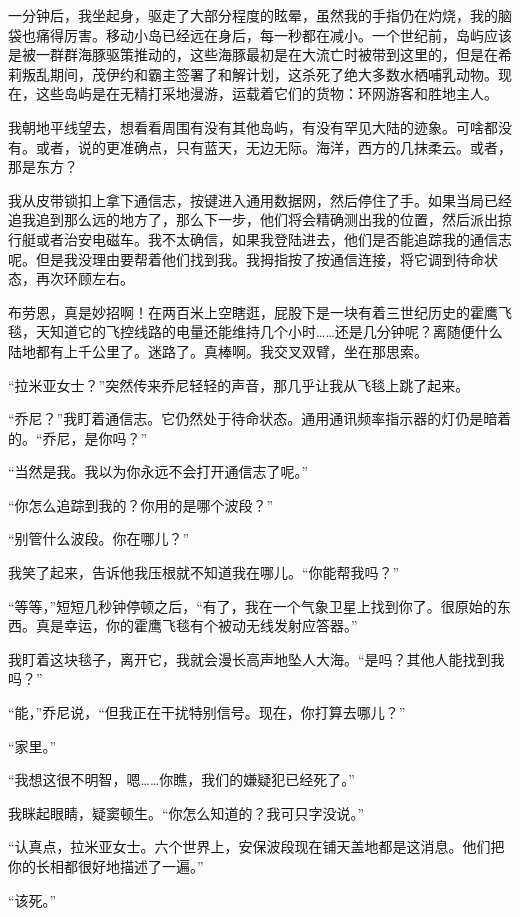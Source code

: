 \documentclass[AutoFakeBold=true]{book}
\begin{document}
一分钟后，我坐起身，驱走了大部分程度的眩晕，虽然我的手指仍在灼烧，我的脑袋也痛得厉害。移动小岛已经远在身后，每一秒都在减小。一个世纪前，岛屿应该是被一群群海豚驱策推动的，这些海豚最初是在大流亡时被带到这里的，但是在希莉叛乱期间，茂伊约和霸主签署了和解计划，这杀死了绝大多数水栖哺乳动物。现在，这些岛屿是在无精打采地漫游，运载着它们的货物：环网游客和胜地主人。

我朝地平线望去，想看看周围有没有其他岛屿，有没有罕见大陆的迹象。可啥都没有。或者，说的更准确点，只有蓝天，无边无际。海洋，西方的几抹柔云。或者，那是东方？

我从皮带锁扣上拿下通信志，按键进入通用数据网，然后停住了手。如果当局已经追我追到那么远的地方了，那么下一步，他们将会精确测出我的位置，然后派出掠行艇或者治安电磁车。我不太确信，如果我登陆进去，他们是否能追踪我的通信志呢。但是我没理由要帮着他们找到我。我拇指按了按通信连接，将它调到待命状态，再次环顾左右。

布劳恩，真是妙招啊！在两百米上空瞎逛，屁股下是一块有着三世纪历史的霍鹰飞毯，天知道它的飞控线路的电量还能维持几个小时……还是几分钟呢？离随便什么陆地都有上千公里了。迷路了。真棒啊。我交叉双臂，坐在那思索。

``拉米亚女士？''突然传来乔尼轻轻的声音，那几乎让我从飞毯上跳了起来。

``乔尼？''我盯着通信志。它仍然处于待命状态。通用通讯频率指示器的灯仍是暗着的。``乔尼，是你吗？''

``当然是我。我以为你永远不会打开通信志了呢。''

``你怎么追踪到我的？你用的是哪个波段？''

``别管什么波段。你在哪儿？''

我笑了起来，告诉他我压根就不知道我在哪儿。``你能帮我吗？''

``等等，''短短几秒钟停顿之后，``有了，我在一个气象卫星上找到你了。很原始的东西。真是幸运，你的霍鹰飞毯有个被动无线发射应答器。''

我盯着这块毯子，离开它，我就会漫长高声地坠人大海。``是吗？其他人能找到我吗？''

``能，''乔尼说，``但我正在干扰特别信号。现在，你打算去哪儿？''

``家里。''

``我想这很不明智，嗯……你瞧，我们的嫌疑犯已经死了。''

我眯起眼睛，疑窦顿生。``你怎么知道的？我可只字没说。''

``认真点，拉米亚女士。六个世界上，安保波段现在铺天盖地都是这消息。他们把你的长相都很好地描述了一遍。''

``该死。''
\end{document}
